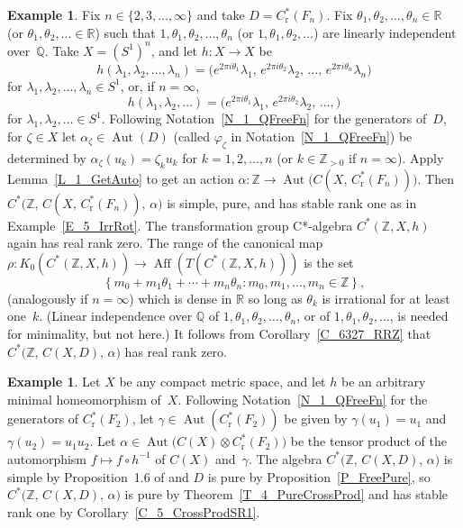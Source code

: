 \documentclass[10pt]{amsart}
\numberwithin{equation}{section}
\theoremstyle{definition}
\newtheorem{exa}[thm]{Example}
\newcommand{\af}{\alpha}
\newcommand{\gm}{\gamma}
\newcommand{\zt}{\zeta}
\newcommand{\te}{\theta}
\newcommand{\ld}{\lambda}
\newcommand{\ph}{\varphi}
\newcommand{\Q}{{\mathbb{Q}}}
\newcommand{\Z}{{\mathbb{Z}}}
\newcommand{\R}{{\mathbb{R}}}
\newcommand{\N}{{\mathbb{Z}}_{> 0}}
\newcommand{\Aut}{{\operatorname{Aut}}}
\newcommand{\Aff}{{\operatorname{Aff}}}
\newcommand{\I}{\infty}
\newcommand{\set}[1]{\left\{ #1 \right\}}
\begin{document}
\begin{exa}\label{E_6_MultiFrst}
Fix $n \in \{ 2, 3, \ldots, \I \}$ and take
$D = C^*_{\mathrm{r}} (F_{n})$.
Fix $\te_1, \te_2, \ldots, \te_n \in \R$
(or $\te_1, \te_2, \ldots \in \R$)
such that $1, \te_1, \te_2, \ldots, \te_n$
(or $1, \te_1, \te_2, \ldots$)
are linearly independent over~$\Q$.
Take $X = (S^{1})^{n}$, and let $h \colon X \to X$ be
\[
h (\ld_1, \ld_2, \ldots, \ld_n)
 = \bigl( e^{2 \pi i \te_1} \ld_1, \, e^{2 \pi i \te_2} \ld_2,
 \, \ldots, \, e^{2 \pi i \te_n} \ld_n \bigr)
\]
for $\ld_1, \ld_2, \ldots, \ld_n \in S^1$,
or, if $n = \I$,
\[
h (\ld_1, \ld_2, \ldots)
 = \bigl( e^{2 \pi i \te_1} \ld_1, \, e^{2 \pi i \te_2} \ld_2,
 \, \ldots, \bigr)
\]
for $\ld_1, \ld_2, \ldots \in S^1$.
Following
Notation~\ref{N_1_QFreeFn} for the generators of~$D$,
for $\zt \in X$ let $\af_{\zt} \in \Aut (D)$
(called $\ph_{\zt}$ in Notation~\ref{N_1_QFreeFn}) be
determined by $\af_{\zt} (u_k) = \zt_k u_k$ for
$k = 1, 2, \ldots, n$ (or $k \in \N$ if $n = \I$).
Apply Lemma~\ref{L_1_GetAuto} to get an action
$\af \colon
\Z \to \Aut \bigl( C (X, \, C^*_{\mathrm{r}} (F_{n}) ) \bigr)$.
Then
$C^* \bigl( \Z, \, C (X, \, C^*_{\mathrm{r}} (F_{n}) ), \, \af \bigr)$
is simple, pure, and has stable rank one as in
Example~\ref{E_5_IrrRot}.
The transformation group C*-algebra
$C^* ( \Z, X, h )$ again has real rank zero.
The range of the canonical map
$\rho \colon K_{0} (C^* ( \Z, X, h )) \to \Aff (T (C^* ( \Z, X, h )))$
is the set
\[
\set{m_0 + m_1 \theta_1 + \cdots + m_n \theta_n
\colon m_0, m_1, \ldots, m_n \in \Z},
\]
(analogously if $n = \I$)
which is dense in $\R$ so long as $\theta_k$ is irrational
for at least one~$k$.
(Linear independence over $\Q$ of
$1, \te_1, \te_2, \ldots, \te_n$, or of $1, \te_1, \te_2, \ldots$,
is needed for minimality, but not here.)
It follows from Corollary~\ref{C_6327_RRZ} that
$C^* \bigl( \Z, \, C (X, D ), \, \af \bigr)$ has real rank zero.
\end{exa}

\begin{exa}\label{E_7_CSrFGp_Furst}
Let $X$ be any compact metric space, and let $h$ be an
arbitrary minimal homeomorphism of~$X$.
Following Notation~\ref{N_1_QFreeFn} for the generators
of $C^*_{\mathrm{r}} (F_{2})$, let
$\gm \in \Aut ( C^*_{\mathrm{r}} (F_{2}) )$ be
given by $\gm (u_1) = u_1$ and $\gm (u_2) = u_1 u_2$.
Let
$\af \in \Aut \big( C (X) \otimes C^*_{\mathrm{r}} (F_{2}) \big)$
be the tensor product of the automorphism
$f \mapsto f \circ h^{-1}$ of $C (X)$ and~$\gm$.
The algebra
$C^* \big( \Z, \, C (X, D ), \, \af \big)$
is simple by Proposition~1.6 of \cite{ArBcPh2} and
$D$ is pure by Proposition~\ref{P_FreePure},
so $C^* \big( \Z, \, C (X, D ), \, \af \big)$ is pure by
Theorem~\ref{T_4_PureCrossProd} and has stable rank
one by Corollary~\ref{C_5_CrossProdSR1}.
\end{exa}
\end{document}
